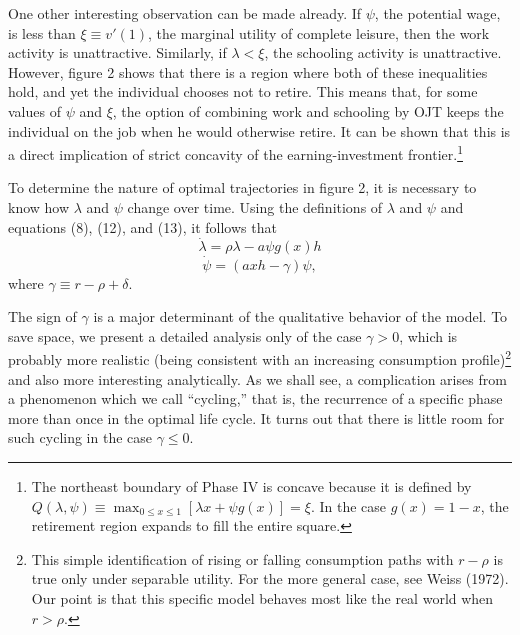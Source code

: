 \documentclass[11pt,fleqn]{article}
\begin{document}
One other interesting observation can be made already. If $\psi$, the potential wage, is less than $\xi \equiv v'(1)$, the marginal utility of complete leisure, then the work activity is unattractive. Similarly, if $\lambda < \xi$, the schooling activity is unattractive. However, figure 2 shows that there is a region where both of these inequalities hold, and yet the individual chooses not to retire. This means that, for some values of $\psi$ and $\xi$, the option of combining work and schooling by OJT keeps the individual on the job when he would otherwise retire. It can be shown that this is a direct implication of strict concavity of the earning-investment frontier.\footnote{The northeast boundary of Phase IV is concave because it is defined by $Q(\lambda, \psi) \equiv \max_{0 \leq x \leq 1} [\lambda x + \psi g(x)] = \xi$. In the case $g(x) = 1 - x$, the retirement region expands to fill the entire square.}

To determine the nature of optimal trajectories in figure 2, it is necessary to know how $\lambda$ and $\psi$ change over time. Using the definitions of $\lambda$ and $\psi$ and equations (8), (12), and (13), it follows that
\begin{equation}
\dot{\lambda} = \rho \lambda - a \psi g(x)h
\end{equation}
\begin{equation}
\dot{\psi} = (axh - \gamma)\psi,
\end{equation}
where $\gamma \equiv r - \rho + \delta$.

The sign of $\gamma$ is a major determinant of the qualitative behavior of the model. To save space, we present a detailed analysis only of the case $\gamma > 0$, which is probably more realistic (being consistent with an increasing consumption profile)\footnote{This simple identification of rising or falling consumption paths with $r - \rho$ is true only under separable utility. For the more general case, see Weiss (1972). Our point is that this specific model behaves most like the real world when $r > \rho$.} and also more interesting analytically. As we shall see, a complication arises from a phenomenon which we call ``cycling,'' that is, the recurrence of a specific phase more than once in the optimal life cycle. It turns out that there is little room for such cycling in the case $\gamma \leq 0$.
\end{document}
